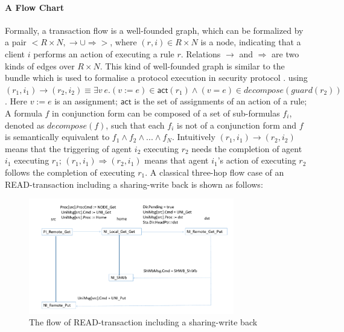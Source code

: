 \documentclass{llncs}
\begin{document}
\paragraph*{A Flow Chart} Formally, a transaction flow is a well-founded graph, which can be formalized by a pair $<R \times N, \rightarrow \cup \Rightarrow>$, where $(r,i) \in R \times N$ is a  node, indicating that a client $i$ performs an action of executing a rule $r$. Relations  $\rightarrow$  and $\Rightarrow$ are two kinds of edges over $R \times N$. This kind of well-founded graph is similar to the bundle which is used to formalise a protocol execution in security protocol \cite{}. using $(r_1,i_1) \rightarrow (r_2,i_2) \equiv \exists v~e. (v:=e) \in \mathsf{act}(r_1) \land (v=e) \in decompose(guard(r_2))$. Here $v:=e$ is an assignment; $\mathsf{act}$ is the set of assignments of an action of a rule; A formula $f$ in conjunction form can be composed of a set of sub-formulas $f_i$, denoted as $decompose(f)$, such that each $f_i$  is not of a conjunction form and $f$ is semantically equivalent to $f_1 \land f_2 \land ... \land f_N$. Intuitively $(r_1,i_1) \rightarrow (r_2,i_2)$ means that the triggering of agent $i_2$ executing $r_2$ needs the completion of agent $i_1$ executing $r_1$; $(r_1,i_1) \Rightarrow (r_2,i_1)$ means that agent $i_1$'s action of executing $r_2$ follows the completion of  executing $r_1$. A classical three-hop flow case of an READ-transaction including a sharing-write back is shown as follows:

\vspace{-20pt}
\begin{figure}[htbp]
\centering
\includegraphics[width=0.8\textwidth]{flow2.pdf}
\vspace{-20pt}
\caption{The flow of READ-transaction including a sharing-write back\label{fig:arch}}
\end{figure}
\vspace{-15pt}
\end{document}

